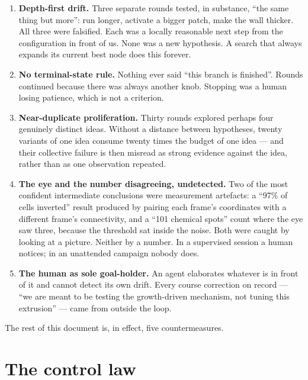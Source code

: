 \documentclass[11pt]{article}
\begin{document}
\begin{enumerate}\itemsep3pt
\item \textbf{Depth-first drift.} Three separate rounds tested, in substance, ``the same thing but
more'': run longer, activate a bigger patch, make the wall thicker. All three were falsified. Each
was a locally reasonable next step from the configuration in front of us. None was a new
hypothesis. A search that always expands its current best node does this forever.

\item \textbf{No terminal-state rule.} Nothing ever said ``this branch is finished''. Rounds
continued because there was always another knob. Stopping was a human losing patience, which is
not a criterion.

\item \textbf{Near-duplicate proliferation.} Thirty rounds explored perhaps four genuinely
distinct ideas. Without a distance between hypotheses, twenty variants of one idea consume twenty
times the budget of one idea --- and their collective failure is then misread as strong evidence
against the idea, rather than as one observation repeated.

\item \textbf{The eye and the number disagreeing, undetected.} Two of the most confident
intermediate conclusions were measurement artefacts: a ``97\% of cells inverted'' result produced
by pairing each frame's coordinates with a different frame's connectivity, and a ``101 chemical
spots'' count where the eye saw three, because the threshold sat inside the noise. Both were
caught by looking at a picture. Neither by a number. In a supervised session a human notices; in
an unattended campaign nobody does.

\item \textbf{The human as sole goal-holder.} An agent elaborates whatever is in front of it and
cannot detect its own drift. Every course correction on record --- ``we are meant to be testing
the growth-driven mechanism, not tuning this extrusion'' --- came from outside the loop.
\end{enumerate}

The rest of this document is, in effect, five countermeasures.

\section{The control law}
\label{sec:control}
\end{document}
